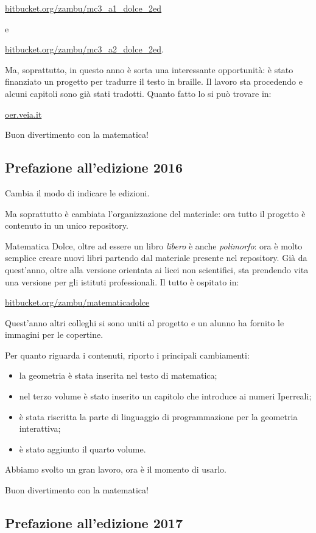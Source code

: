 \url{bitbucket.org/zambu/mc3_a1_dolce_2ed}

e 

\url{bitbucket.org/zambu/mc3_a2_dolce_2ed}. 


Ma, soprattutto, in questo anno è sorta una interessante opportunità: 
è stato finanziato un progetto per tradurre il testo in braille. 
Il lavoro sta procedendo e alcuni capitoli sono già stati tradotti. 
Quanto fatto lo si può trovare in:

\url{oer.veia.it}

Buon divertimento con la matematica!

\subsection*{Prefazione all'edizione 2016}

Cambia il modo di indicare le edizioni. 

Ma soprattutto è cambiata l'organizzazione del materiale: ora tutto il 
progetto è contenuto in un unico repository.

Matematica Dolce, oltre ad essere un libro \emph{libero} è anche 
\emph{polimorfo}: ora è molto semplice creare nuovi libri partendo dal 
materiale presente nel repository. Già da quest'anno, oltre alla versione 
orientata ai licei non scientifici, sta prendendo vita una versione per gli 
istituti professionali.
Il tutto è ospitato in:

\url{bitbucket.org/zambu/matematicadolce}

Quest'anno altri colleghi si sono uniti al progetto e un alunno ha fornito le 
immagini per le copertine.

Per quanto riguarda i contenuti, riporto i principali cambiamenti:
\begin{itemize} [nosep]
 \item la geometria è stata inserita nel testo di matematica;
 \item nel terzo volume è stato inserito un capitolo che introduce ai numeri 
Iperreali;
 \item è stata riscritta la parte di linguaggio di programmazione per la 
geometria interattiva;
 \item è stato aggiunto il quarto volume.
\end{itemize}

Abbiamo svolto un gran lavoro, ora è il momento di usarlo.

Buon divertimento con la matematica!

\subsection*{Prefazione all'edizione 2017}

